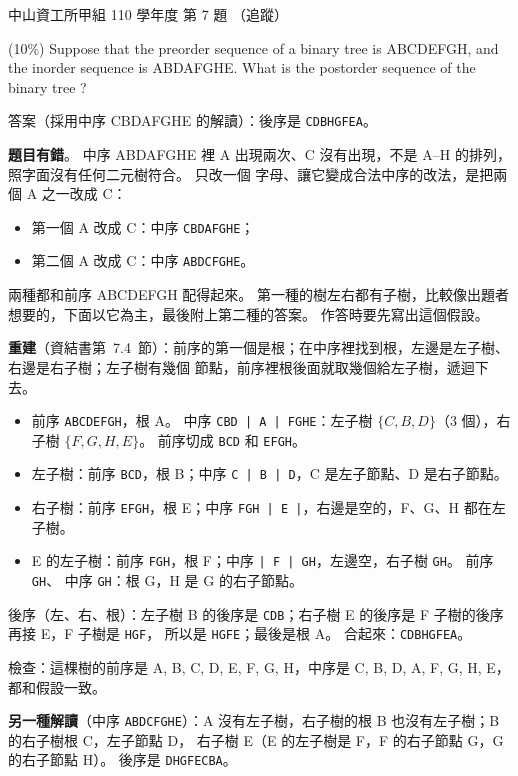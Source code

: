 \begin{pastexam}[label={px:nsysu-110-osds-01}]{中山資工所甲組 110 學年度 第 7 題}
（追蹤）

(10\%) Suppose that the preorder sequence of a binary tree is ABCDEFGH, and the inorder sequence is
ABDAFGHE. What is the postorder sequence of the binary tree ?
\end{pastexam}

\begin{pastsoln}
答案（採用中序 CBDAFGHE 的解讀）：後序是 \texttt{CDBHGFEA}。

\textbf{題目有錯}。 中序 ABDAFGHE 裡 A 出現兩次、C 沒有出現，不是 A--H 的排列，照字面沒有任何二元樹符合。 只改一個
字母、讓它變成合法中序的改法，是把兩個 A 之一改成 C：
\begin{itemize}
\item 第一個 A 改成 C：中序 \texttt{CBDAFGHE}；
\item 第二個 A 改成 C：中序 \texttt{ABDCFGHE}。
\end{itemize}
兩種都和前序 ABCDEFGH 配得起來。 第一種的樹左右都有子樹，比較像出題者想要的，下面以它為主，最後附上第二種的答案。
作答時要先寫出這個假設。

\textbf{重建}（資結書第~7.4~節）：前序的第一個是根；在中序裡找到根，左邊是左子樹、右邊是右子樹；左子樹有幾個
節點，前序裡根後面就取幾個給左子樹，遞迴下去。
\begin{itemize}
\item 前序 \texttt{ABCDEFGH}，根 A。 中序 \texttt{CBD | A | FGHE}：左子樹 $\{C, B, D\}$（$3$ 個），右子樹
$\{F, G, H, E\}$。 前序切成 \texttt{BCD} 和 \texttt{EFGH}。
\item 左子樹：前序 \texttt{BCD}，根 B；中序 \texttt{C | B | D}，C 是左子節點、D 是右子節點。
\item 右子樹：前序 \texttt{EFGH}，根 E；中序 \texttt{FGH | E |}，右邊是空的，F、G、H 都在左子樹。
\item E 的左子樹：前序 \texttt{FGH}，根 F；中序 \texttt{| F | GH}，左邊空，右子樹 \texttt{GH}。 前序 \texttt{GH}、
中序 \texttt{GH}：根 G，H 是 G 的右子節點。
\end{itemize}
\begin{center}
\end{center}
後序（左、右、根）：左子樹 B 的後序是 \texttt{CDB}；右子樹 E 的後序是 F 子樹的後序再接 E，F 子樹是 \texttt{HGF}，
所以是 \texttt{HGFE}；最後是根 A。 合起來：\texttt{CDBHGFEA}。

檢查：這棵樹的前序是 A, B, C, D, E, F, G, H，中序是 C, B, D, A, F, G, H, E，都和假設一致。

\textbf{另一種解讀}（中序 \texttt{ABDCFGHE}）：A 沒有左子樹，右子樹的根 B 也沒有左子樹；B 的右子樹根 C，左子節點 D，
右子樹 E（E 的左子樹是 F，F 的右子節點 G，G 的右子節點 H）。 後序是 \texttt{DHGFECBA}。
\end{pastsoln}
